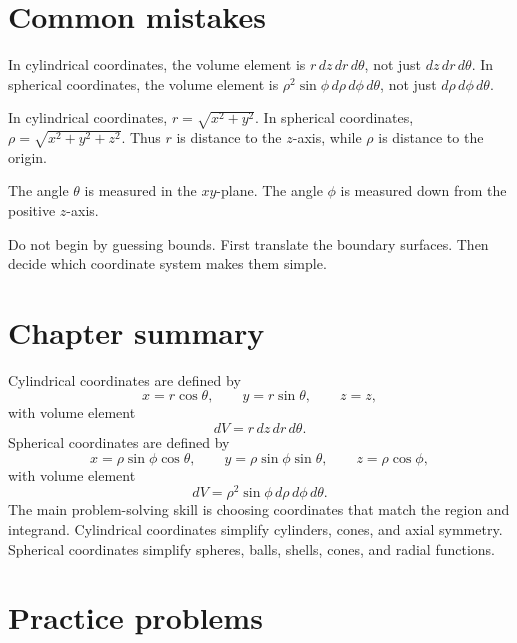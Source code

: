 \documentclass[11pt,oneside]{book}
\begin{document}
\section{Common mistakes}

\begin{warningbox}
In cylindrical coordinates, the volume element is $r\,dz\,dr\,d\theta$, not just $dz\,dr\,d\theta$. In spherical coordinates, the volume element is $\rho^2\sin\phi\,d\rho\,d\phi\,d\theta$, not just $d\rho\,d\phi\,d\theta$.
\end{warningbox}

\begin{warningbox}
In cylindrical coordinates, $r=\sqrt{x^2+y^2}$. In spherical coordinates, $\rho=\sqrt{x^2+y^2+z^2}$. Thus $r$ is distance to the $z$-axis, while $\rho$ is distance to the origin.
\end{warningbox}

\begin{warningbox}
The angle $\theta$ is measured in the $xy$-plane. The angle $\phi$ is measured down from the positive $z$-axis.
\end{warningbox}

\begin{warningbox}
Do not begin by guessing bounds. First translate the boundary surfaces. Then decide which coordinate system makes them simple.
\end{warningbox}

\section{Chapter summary}

Cylindrical coordinates are defined by
\[
x=r\cos\theta,\qquad y=r\sin\theta,\qquad z=z,
\]
with volume element
\[
dV=r\,dz\,dr\,d\theta.
\]
Spherical coordinates are defined by
\[
x=\rho\sin\phi\cos\theta,\qquad y=\rho\sin\phi\sin\theta,\qquad z=\rho\cos\phi,
\]
with volume element
\[
dV=\rho^2\sin\phi\,d\rho\,d\phi\,d\theta.
\]
The main problem-solving skill is choosing coordinates that match the region and integrand. Cylindrical coordinates simplify cylinders, cones, and axial symmetry. Spherical coordinates simplify spheres, balls, shells, cones, and radial functions.

\section{Practice problems}
\end{document}
